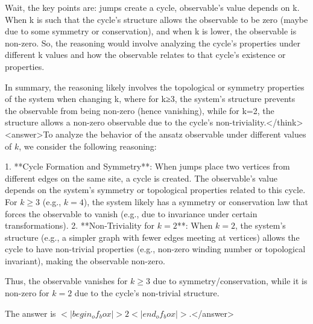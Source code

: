 Wait, the key points are: jumps create a cycle, observable's value depends on k. When k is such that the cycle's structure allows the observable to be zero (maybe due to some symmetry or conservation), and when k is lower, the observable is non-zero. So, the reasoning would involve analyzing the cycle's properties under different k values and how the observable relates to that cycle's existence or properties.

In summary, the reasoning likely involves the topological or symmetry properties of the system when changing k, where for k≥3, the system's structure prevents the observable from being non-zero (hence vanishing), while for k=2, the structure allows a non-zero observable due to the cycle's non-triviality.</think><answer>To analyze the behavior of the ansatz observable under different values of \( k \), we consider the following reasoning:  

1. **Cycle Formation and Symmetry**: When jumps place two vertices from different edges on the same site, a cycle is created. The observable’s value depends on the system’s symmetry or topological properties related to this cycle. For \( k \geq 3 \) (e.g., \( k = 4 \)), the system likely has a symmetry or conservation law that forces the observable to vanish (e.g., due to invariance under certain transformations).  
2. **Non-Triviality for \( k = 2 \)**: When \( k = 2 \), the system’s structure (e.g., a simpler graph with fewer edges meeting at vertices) allows the cycle to have non-trivial properties (e.g., non-zero winding number or topological invariant), making the observable non-zero.  

Thus, the observable vanishes for \( k \geq 3 \) due to symmetry/conservation, while it is non-zero for \( k = 2 \) due to the cycle’s non-trivial structure.  

The answer is \(<|begin_of_box|>2<|end_of_box|>\).</answer>